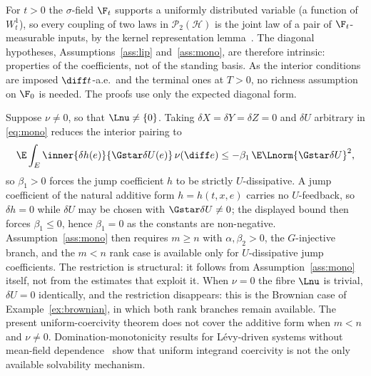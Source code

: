 \begin{remark}\label{rem:intrinsic}
For $t>0$ the $\sigma$-field $\F_t$ supports a uniformly distributed variable (a
function of $W^1_t$), so every coupling of two laws in $\mathcal P_2(\mathcal H)$ is
the joint law of a pair of $\F_t$-measurable
inputs, by the kernel representation lemma~\cite[Lemma~4.22]{Kallenberg}. The diagonal hypotheses,
Assumptions~\ref{ass:lip} and~\ref{ass:mono}, are therefore intrinsic: properties of
the coefficients, not of the standing basis. As the interior conditions are imposed
$\diff t$-a.e.\ and the terminal ones at $T>0$, no richness assumption on $\F_0$ is
needed. The proofs use only the expected diagonal form.
\end{remark}
\begin{remark}\label{rem:beta1-dich}
Suppose $\nu\neq0$, so that $\Lnu\neq\{0\}$. Taking $\delta X=\delta Y=\delta Z=0$ and $\delta U$ arbitrary in \eqref{eq:mono} reduces the
interior pairing to
\[
\E\int_E\inner{\delta h(e)}{\Gstar\delta U(e)}\,\nu(\diff e)
\le-\beta_1\,\E\Lnorm{\Gstar\delta U}^2 ,
\]
so $\beta_1>0$ forces the jump coefficient $h$ to be strictly $U$-dissipative. A jump
coefficient of the natural additive form $h=h(t,x,e)$ carries no $U$-feedback, so
$\delta h=0$ while $\delta U$ may be chosen with $\Gstar\delta U\neq0$; the displayed bound
then forces $\beta_1\le0$, hence $\beta_1=0$ as the constants are non-negative.
Assumption~\ref{ass:mono} then requires $m\ge n$ with $\alpha,\beta_2>0$, the
$G$-injective branch, and the $m<n$ rank case is available only for $U$-dissipative jump
coefficients.
The restriction is structural: it follows from Assumption~\ref{ass:mono} itself, not from
the estimates that exploit it. When $\nu=0$ the fibre $\Lnu$ is trivial, $\delta U=0$
identically, and the restriction disappears: this is the Brownian case of
Example~\ref{ex:brownian}, in which both rank branches remain available. The present
uniform-coercivity theorem does not cover the additive form when $m<n$ and $\nu\neq0$.
Domination-monotonicity results for L\'evy-driven systems without mean-field
dependence~\cite{XuTangMeng} show that uniform integrand coercivity is not the only
available solvability mechanism.
\end{remark}
